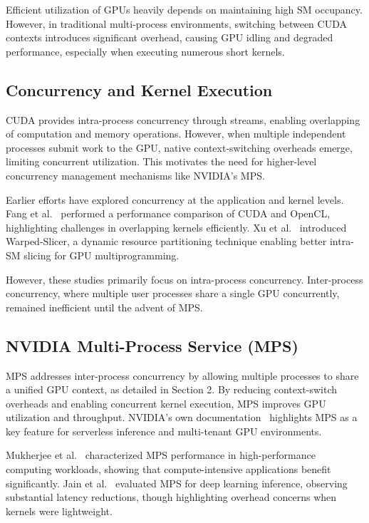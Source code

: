 \documentclass[sigconf,nonacm]{acmart}
\begin{document}
Efficient utilization of GPUs heavily depends on maintaining high SM occupancy. However, in traditional multi-process environments, switching between CUDA contexts introduces significant overhead, causing GPU idling and degraded performance, especially when executing numerous short kernels.

\subsection{Concurrency and Kernel Execution}
CUDA provides intra-process concurrency through streams, enabling overlapping of computation and memory operations. However, when multiple independent processes submit work to the GPU, native context-switching overheads emerge, limiting concurrent utilization. This motivates the need for higher-level concurrency management mechanisms like NVIDIA’s MPS.

Earlier efforts have explored concurrency at the application and kernel levels. Fang et al.~\cite{fang2011gpu} performed a performance comparison of CUDA and OpenCL, highlighting challenges in overlapping kernels efficiently. Xu et al.~\cite{xu2016warped} introduced Warped-Slicer, a dynamic resource partitioning technique enabling better intra-SM slicing for GPU multiprogramming.

However, these studies primarily focus on intra-process concurrency. Inter-process concurrency, where multiple user processes share a single GPU concurrently, remained inefficient until the advent of MPS.


\subsection{NVIDIA Multi-Process Service (MPS)}

MPS addresses inter-process concurrency by allowing multiple processes to share a unified GPU context, as detailed in Section 2. By reducing context-switch overheads and enabling concurrent kernel execution, MPS improves GPU utilization and throughput. NVIDIA’s own documentation~\cite{nvidia_mps} highlights MPS as a key feature for serverless inference and multi-tenant GPU environments.

Mukherjee et al.~\cite{mukherjee2015characterizing} characterized MPS performance in high-performance computing workloads, showing that compute-intensive applications benefit significantly. Jain et al.~\cite{jain2018efficient} evaluated MPS for deep learning inference, observing substantial latency reductions, though highlighting overhead concerns when kernels were lightweight.
\end{document}
